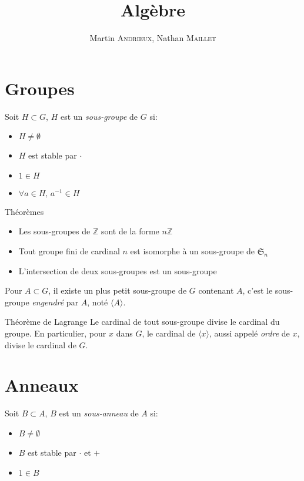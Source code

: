 \documentclass[french, a4paper, 11pt, twocolumn]{article}
\title{Algèbre}
\author{Martin \textsc{Andrieux}, Nathan \textsc{Maillet}}
\date{}
\newcommand{\Z}{\mathbb{Z}}   %
\begin{document}
\maketitle

\section{Groupes}
\begin{definition}
  Soit $H\subset G$, $H$ est un \emph{sous-groupe} de $G$ si:
  \begin{itemize}[label=$\bullet$]
    \item $H\neq\emptyset$
    \item $H$ est stable par $\cdot$
    \item $1\in H$
    \item $\forall a \in H,\, a^{-1}\in H$
  \end{itemize}
\end{definition}

\begin{theoreme}{Théorèmes}
  \begin{itemize}[label=$\bullet$]
    \item Les sous-groupes de $\Z$ sont de la forme $n\Z$
    \item Tout groupe fini de cardinal $n$ est isomorphe à un sous-groupe de $\mathfrak S_{n}$
    \item L'intersection de deux sous-groupes est un sous-groupe
  \end{itemize}
\end{theoreme}

\begin{definition}
  Pour $A\subset G$, il existe un plus petit sous-groupe de $G$ contenant $A$, c'est le sous-groupe \emph{engendré} par $A$, noté $\langle A\rangle$.
\end{definition}

\begin{theoreme}{Théorème de Lagrange}
  Le cardinal de tout sous-groupe divise le cardinal du groupe.
  \tcblower
  En particulier, pour $x$ dans $G$, le cardinal de $\langle x \rangle$, aussi appelé \emph{ordre} de $x$, divise le cardinal de $G$.
\end{theoreme}

\section{Anneaux}
\begin{definition}
  Soit $B\subset A$, $B$ est un \emph{sous-anneau} de $A$ si:
  \begin{itemize}[label=$\bullet$]
    \item $B\neq\emptyset$
    \item $B$ est stable par $\cdot$ et $+$
    \item $1\in B$
  \end{itemize}
\end{definition}
\end{document}
